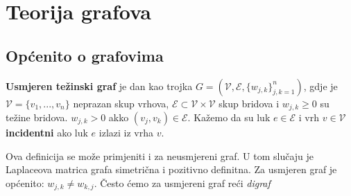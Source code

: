 \chapter[Teorija grafova][TG]{Teorija grafova}
\section[Općenito o grafovima][Općenito o grafovima]{Općenito o grafovima}

\begin{defn}
\textbf{Usmjeren težinski graf} je dan kao trojka $G = ( \mathcal{V}, \mathcal{E}, \{ w_{j,k} \}_{j,k=1}^{n} )$, gdje je $\mathcal{V} = \{v_1,...,v_n\}$ neprazan skup vrhova, $\mathcal{E} \subset \mathcal{V} \times \mathcal{V} $ skup bridova i $w_{j,k} \geq 0 $ su težine bridova. $w_{j,k} > 0$  akko $(v_j,v_k) \in \mathcal{E}$. 
Kažemo da su luk $e \in \mathcal{E}$ i vrh $v \in \mathcal{V}$ \textbf{incidentni} ako luk $e$ izlazi iz vrha $v$.
\end{defn}
\begin{rem}
    Ova definicija se može primjeniti i za neusmjereni graf. U tom slučaju je Laplaceova matrica grafa simetrična i pozitivno definitna.
    Za usmjeren graf je općenito: $w_{j,k} \neq w_{k,j}$.
    Često ćemo za usmjereni graf reći \emph{digraf}
\end{rem}


